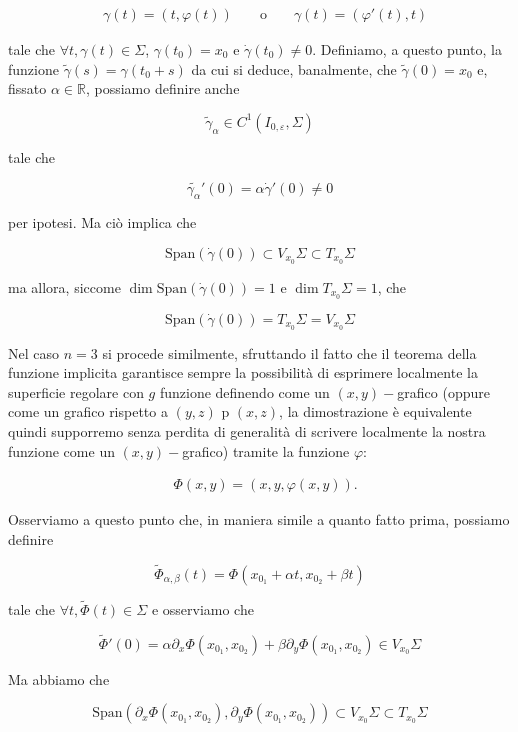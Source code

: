 \begin{align*}
&\gamma(t) = (t, \varphi(t)) & &\text{ o } & &\gamma(t)=(\varphi'(t), t)
\end{align*}

tale che $\forall t, \gamma(t) \in \Sigma$, $\gamma(t_0) = x_0$ e $\dot{\gamma}(t_0) \neq 0$. Definiamo, a questo punto, la funzione $\tilde{\gamma}(s) = \gamma(t_0 + s)$ da cui si deduce, banalmente, che $\tilde{\gamma}(0) = x_0$ e, fissato $\alpha \in \mathbb{R}$, possiamo definire anche

$$
\tilde{\gamma}_\alpha \in C^{1}(I_{0, \varepsilon}, \Sigma)
$$

tale che

$$
\tilde{\gamma_\alpha}'(0) = \alpha \dot{\gamma}'(0) \neq 0 
$$

per ipotesi. Ma ciò implica che

$$
\text{Span}(\dot{\gamma}(0)) \subset V_{x_0} \Sigma \subset T_{x_0} \Sigma
$$

ma allora, siccome $\dim{\text{Span}(\dot{\gamma}(0))} = 1$ e $\dim{T_{x_0} \Sigma} = 1$, che

$$
\text{Span}(\dot{\gamma}(0)) = T_{x_0} \Sigma = V_{x_0} \Sigma
$$

Nel caso $n=3$ si procede similmente, sfruttando il fatto che il teorema della funzione implicita garantisce sempre la possibilità di esprimere localmente la superficie regolare con $g$ funzione definendo come un $(x, y)-$grafico (oppure come un grafico rispetto a $(y, z)$ p $(x, z)$, la dimostrazione è equivalente quindi supporremo senza perdita di generalità di scrivere localmente la nostra funzione come un $(x, y)-$grafico) tramite la funzione $\varphi$:

\begin{align*}
&\Phi(x, y) = (x, y, \varphi(x, y)).
\end{align*}

Osserviamo a questo punto che, in maniera simile a quanto fatto prima, possiamo definire

$$
\tilde{\Phi}_{\alpha, \beta}(t) = \Phi(x_{0_1} + \alpha t, x_{0_2} + \beta t)
$$

tale che $\forall t, \tilde{\Phi}(t) \in \Sigma$ e osserviamo che

$$
\tilde{\Phi}'(0) = \alpha \partial_x \Phi(x_{0_1}, x_{0_2}) + \beta \partial_y \Phi(x_{0_1}, x_{0_2}) \in V_{x_0} \Sigma
$$

Ma abbiamo che 

$$
\text{Span}(\partial_x \Phi(x_{0_1}, x_{0_2}), \partial_y \Phi(x_{0_1}, x_{0_2})) \subset V_{x_0} \Sigma \subset T_{x_0} \Sigma
$$

